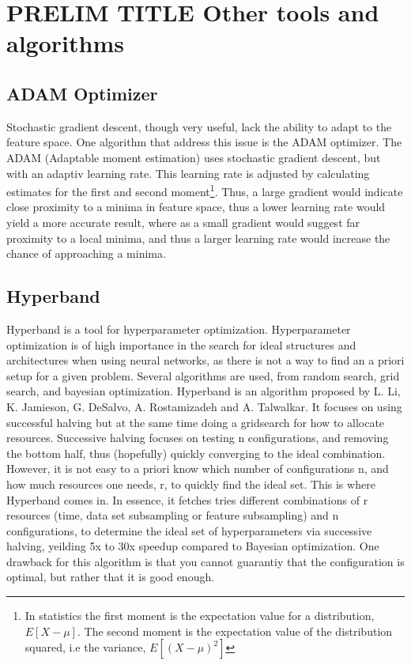 \section{PRELIM TITLE Other tools and algorithms}
\subsection*{ADAM Optimizer}
Stochastic gradient descent, though very useful, lack the ability to adapt to the feature space. One algorithm that address this
issue is the ADAM optimizer\cite{ADAM:opti}. The ADAM (Adaptable moment estimation) uses stochastic gradient descent, but with 
an adaptiv learning rate. This learning rate is adjusted by calculating estimates for the first and second moment\footnote{In statistics
the first moment is the expectation value for a distribution, $E[X-\mu]$. The second moment is the 
expectation value of the distribution squared, i.e the variance, $E[(X-\mu)^2]$}. Thus, a large gradient would indicate close proximity 
to a minima in feature space, thus a lower learning rate would yield a more accurate result, 
where as a small gradient would suggest far proximity to a local minima, and thus a larger learning rate would increase the chance 
of approaching a minima.\par 

\subsection*{Hyperband}
Hyperband is a tool for hyperparameter optimization\cite{hyperband:opt}. Hyperparameter optimization is of high importance in the 
search for ideal structures and architectures when using neural networks, as there is not a way to find an a priori setup for a 
given problem. Several algorithms are used, from random search, grid search, and bayesian optimization. Hyperband is an algorithm 
proposed by L. Li, K. Jamieson, G. DeSalvo, A. Rostamizadeh and A. Talwalkar. It focuses on using successful halving\cite{successivehalving}
but at the same time doing a gridsearch for how to allocate resources. Successive halving focuses on testing n configurations, and removing 
the bottom half, thus (hopefully) quickly converging to the ideal combination. However, it is not easy to a priori know which 
number of configurations n, and how much resources one needs, r, to quickly find the ideal set. This is where Hyperband comes in. 
In essence, it fetches tries different combinations of r resources (time, data set subsampling or feature subsampling) and n 
configurations, to determine the ideal set of hyperparameters via successive halving, yeilding 5x to 30x speedup compared to 
Bayesian optimization. One drawback for this algorithm is that you cannot guarantiy that the configuration is optimal, 
but rather that it is good enough. 

